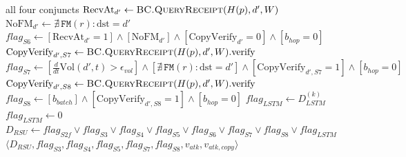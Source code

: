 \documentclass[12pt, a4paper]{report}
\begin{document}
\begin{algorithm}[H]
\begin{algorithmic}[1]
{         all four conjuncts}
  \State $\text{RecvAt}_{d'} \gets
         \textsc{BC.QueryReceipt}(H(p),d',W)$
         \hfill{}
  \State $\text{NoFM}_{d'} \gets
         \nexists\,\texttt{FM}(r){:}\text{dst}{=}d'$
         \hfill{}
  \State $flag_{S6} \gets
         [\text{RecvAt}_{d'}{=}1]
         \land[\text{NoFM}_{d'}]
         \land[\text{CopyVerify}_{d'}{=}0]
         \land[b_{hop}{=}0]$
         \hfill{}
  \State $\text{CopyVerify}_{d',S7} \gets
         \textsc{BC.QueryReceipt}(H(p),d',W).\text{verify}$
  \State $flag_{S7} \gets
         [\tfrac{d}{dt}\text{Vol}(d',t){>}\epsilon_{vol}]
         \land[\nexists\,\texttt{FM}(r){:}\text{dst}{=}d']
         \land[\text{CopyVerify}_{d',S7}{=}1]
         \land[b_{hop}{=}0]$
         \hfill{}
  \State $\text{CopyVerify}_{d',S8} \gets
         \textsc{BC.QueryReceipt}(H(p),d',W).\text{verify}$
  \State $flag_{S8} \gets
         [b_{batch}]
         \land[\text{CopyVerify}_{d',S8}{=}1]
         \land[b_{hop}{=}0]$
         \hfill{}
    \State $flag_{LSTM} \gets D_{LSTM}^{(k)}$
           \hfill{}
  \Else
    \State $flag_{LSTM} \gets 0$
           \hfill{}
  \EndIf
  \State $D_{RSU} \gets flag_{S2f}\lor flag_{S3}
         \lor flag_{S4}\lor flag_{S5}\lor flag_{S6}
         \lor flag_{S7}\lor flag_{S8}\lor flag_{LSTM}$
  \State \Return $\langle D_{RSU}, flag_{S3}, flag_{S4},
         flag_{S5}, flag_{S7}, flag_{S8}, v_{atk},
         v_{atk,copy}\rangle$
         \hfill{}
\EndProcedure
\end{algorithmic}
\label{alg:lrad_rsu_detect}
\end{algorithm}
\end{document}
